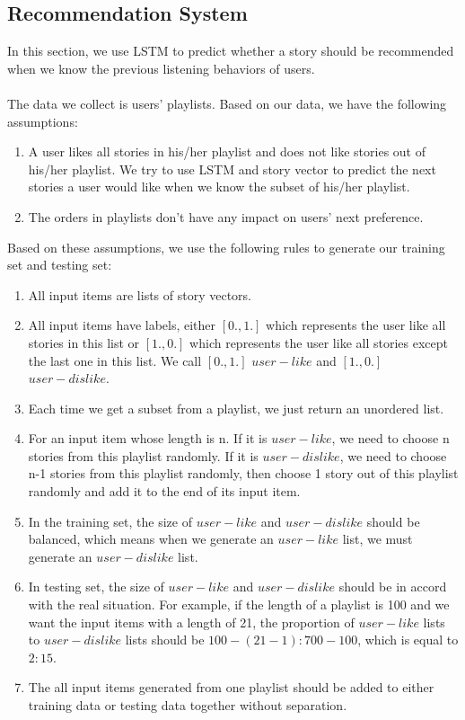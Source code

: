 \documentclass[sigconf]{acmart}
\begin{document}
\subsection{Recommendation System}
In this section, we use LSTM to predict whether a story should be recommended when we know the previous listening behaviors of users.
\\\\
The data we collect is users' playlists. Based on our data, we have the following assumptions: 
\begin{enumerate}
\item A user likes all stories in his/her playlist and does not like stories out of his/her playlist. We try to use LSTM and story vector to predict the next stories a user would like when we know the subset of his/her playlist.
\item The orders in playlists don't have any impact on users' next preference.
\end{enumerate}
Based on these assumptions, we use the following rules to generate our training set and testing set:
\begin{enumerate}
\item All input items are lists of story vectors.
\item All input items have labels, either $[0., 1.]$ which represents the user like all stories in this list or $[1., 0.]$ which represents the user like all stories except the last one in this list. We call $[0., 1.]$ $user-like$ and $[1., 0.]$ $user-dislike$.
\item Each time we get a subset from a playlist, we just return an unordered list.
\item For an input item whose length is n. If it is $user-like$, we need to choose n stories from this playlist randomly. If it is $user-dislike$, we need to choose n-1 stories from this playlist randomly, then choose 1 story out of this playlist randomly and add it to the end of its input item. 
\item In the training set, the size of $user-like$ and $user-dislike$ should be balanced, which means when we generate an $user-like$ list, we must generate an $user-dislike$ list.
\item In testing set, the size of $user-like$ and $user-dislike$ should be in accord with the real situation. For example, if the length of a playlist is 100 and we want the input items with a length of 21, the proportion of $user-like$ lists to $user-dislike$ lists should be $100-(21-1):700-100$, which is equal to $2:15$.
\item The all input items generated from one playlist should be added to either training data or testing data together without separation.
\end{enumerate}
\end{document}
